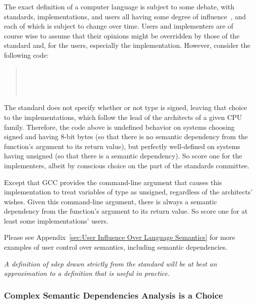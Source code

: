 \documentclass[10]{article}
\begin{document}
The exact definition of a computer language is subject to some debate,
with standards, implementations, and users all having some degree of
influence~\cite{KayvanMemarian2016DepthOfC-1,KayvanMemarian2016DepthOfC-2},
and each of which is subject to change over time.
Users  and implementers are of course wise to assume that their opinions
might be overridden by those of the standard and, for the users,
especially the implementation.
However, consider the following code:

\begin{quote}
	 \\
	\co{\{} \\
	 \\
	\co{\}}
\end{quote}

The standard does not specify whether or not type  is signed,
leaving that choice to the implementations, which follow the lead
of the architects of a given CPU family.
Therefore, the code above is undefined behavior on systems choosing
signed  and having 8-bit bytes (so that there is no semantic
dependency from the  function's argument to its return value),
but perfectly well-defined on systems having unsigned 
(so that there is a semantic dependency).
So score one for the implementers, albeit by conscious choice on the
part of the standards committee.

Except that GCC provides the  command-line
argument that causes this implementation to treat variables of
type  as unsigned, regardless of the architects' wishes.
Given this command-line argument, there is always a semantic dependency
from the  function's argument to its return value.
So score one for at least some implementations' users.

Please see Appendix~\ref{sec:User Influence Over Language Semantics}
for more examples of user control over semantics, including semantic
dependencies.

\emph{A definition of sdep drawn strictly from the standard will be
at best an approximation to a definition that is useful in practice.}

\subsubsection{Complex Semantic Dependencies Analysis is a Choice}
\label{sec:Complex Semantic Dependencies Analysis is a Choice}
\end{document}
